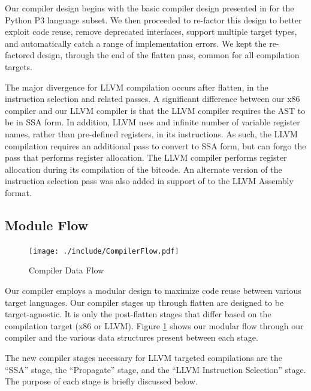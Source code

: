 \documentclass[11pt,twocolumn]{article}
\begin{document}
Our compiler design begins with the basic compiler design presented in
\cite{siek-chang} for the Python P3 language subset.  We then
proceeded to re-factor this design to better exploit code reuse,
remove deprecated interfaces, support multiple target types, and
automatically catch a range of implementation errors. We kept the re-factored 
design, through the end of the flatten pass, common for all compilation 
targets.

The major divergence for LLVM compilation occurs after flatten, in the
instruction selection and related passes. A significant difference
between our x86 compiler and our LLVM compiler is that the LLVM
compiler requires the AST to be in SSA form. In addition, LLVM uses
and infinite number of variable register names, rather than
pre-defined registers, in its instructions. As such, the LLVM
compilation requires an additional pass to convert to SSA form, but
can forgo the pass that performs register allocation. The LLVM
compiler performs register allocation during its compilation of the
bitcode.  An alternate version of the instruction selection pass was
also added in support of to the LLVM Assembly format.

\subsection{Module Flow}
\label{sec:ModuleFlow}

\begin{figure}[htb]
   \centering
   \texttt{[image: ./include/CompilerFlow.pdf]}
   \caption{Compiler Data Flow}
   \label{fig:CompilerFlow}
\end{figure}

Our compiler employs a modular design to maximize code reuse between
various target languages.  Our compiler stages up through flatten are
designed to be target-agnostic. It is only the post-flatten stages
that differ based on the compilation target (x86 or LLVM). Figure
\ref{fig:CompilerFlow} shows our modular flow through our compiler and
the various data structures present between each stage.

The new compiler stages necessary for LLVM targeted compilations are
the ``SSA'' stage, the ``Propagate'' stage, and the ``LLVM Instruction
Selection'' stage. The purpose of each stage is briefly discussed
below.
\end{document}
